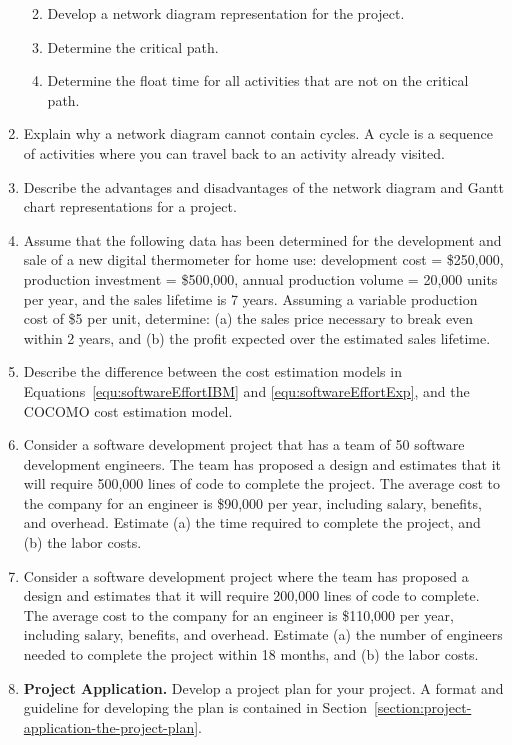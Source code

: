 \begin{enumerate}
\begin{enumerate}
\def\labelenumi{\alph{enumi})}
\item
  Develop a network diagram representation for the project.
\item
  Determine the critical path.
\item
  Determine the float time for all activities that are not on the
  critical path.
\end{enumerate}


  \item
    Explain why a network diagram cannot contain cycles. A cycle is a
    sequence of activities where you can travel back to an activity
    already visited.
  \item
    Describe the advantages and disadvantages of the network diagram and
    Gantt chart representations for a project.
  \item
    Assume that the following data has been determined for the
    development and sale of a new digital thermometer for home use:
    development cost = \$250,000, production investment = \$500,000,
    annual production volume = 20,000 units per year, and the sales
    lifetime is 7 years. Assuming a variable production cost of \$5 per
    unit, determine: (a) the sales price necessary to break even within
    2 years, and (b) the profit expected over the estimated sales
    lifetime.
  \item
    Describe the difference between the cost estimation models in
Equations~\ref{equ:softwareEffortIBM} and \ref{equ:softwareEffortExp}, 
and the COCOMO cost estimation model.
  \item
    Consider a software development project that has a team of 50
    software development engineers. The team has proposed a design and
    estimates that it will require 500,000 lines of code to complete the
    project. The average cost to the company for an engineer is \$90,000
    per year, including salary, benefits, and overhead. Estimate (a) the
    time required to complete the project, and (b) the labor costs.
  \item
    Consider a software development project where the team has proposed
    a design and estimates that it will require 200,000 lines of code to
    complete. The average cost to the company for an engineer is
    \$110,000 per year, including salary, benefits, and overhead.
    Estimate (a) the number of engineers needed to complete the project
    within 18 months, and (b) the labor costs.
  \item
    \textbf{Project Application.} Develop a project plan for your
    project. A format and guideline for developing the plan is contained
    in Section~\ref{section:project-application-the-project-plan}.

\end{enumerate}
